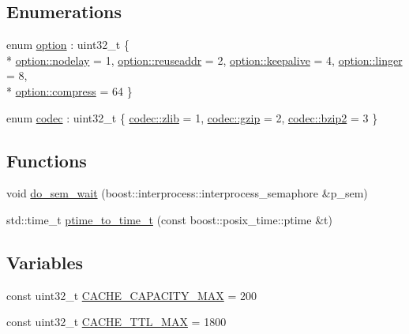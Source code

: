 \subsection*{Enumerations}
\begin{DoxyCompactItemize}
\item 
enum \hyperlink{namespacextd_1_1network_1_1utils_a0acc888a3cdabdadb91fe832ea196a4f}{option} \+: uint32\+\_\+t \{ \\*
\hyperlink{namespacextd_1_1network_1_1utils_a0acc888a3cdabdadb91fe832ea196a4faf0f888198330ff09558650aace4343e3}{option\+::nodelay} = 1, 
\hyperlink{namespacextd_1_1network_1_1utils_a0acc888a3cdabdadb91fe832ea196a4fa087d20314d2967622b76fbf7ce91ebf2}{option\+::reuseaddr} = 2, 
\hyperlink{namespacextd_1_1network_1_1utils_a0acc888a3cdabdadb91fe832ea196a4fa797919b5a9c95dfae9b06cf3086e40c1}{option\+::keepalive} = 4, 
\hyperlink{namespacextd_1_1network_1_1utils_a0acc888a3cdabdadb91fe832ea196a4fafa1711bb276806d1f1808dbb0e31018a}{option\+::linger} = 8, 
\\*
\hyperlink{namespacextd_1_1network_1_1utils_a0acc888a3cdabdadb91fe832ea196a4fa390626c545194d0f20a704589b190994}{option\+::compress} = 64
 \}
\item 
enum \hyperlink{namespacextd_1_1network_1_1utils_a3ac1216ad2037b366cc1f9051a978161}{codec} \+: uint32\+\_\+t \{ \hyperlink{namespacextd_1_1network_1_1utils_a3ac1216ad2037b366cc1f9051a978161a7a990d405d2c6fb93aa8fbb0ec1a3b23}{codec\+::zlib} = 1, 
\hyperlink{namespacextd_1_1network_1_1utils_a3ac1216ad2037b366cc1f9051a978161a749cadba7b2ed8d4a2aaa91a9cb1896c}{codec\+::gzip} = 2, 
\hyperlink{namespacextd_1_1network_1_1utils_a3ac1216ad2037b366cc1f9051a978161a03ce1ba314f367fdd09887fc8f60578b}{codec\+::bzip2} = 3
 \}
\end{DoxyCompactItemize}
\subsection*{Functions}
\begin{DoxyCompactItemize}
\item 
void \hyperlink{namespacextd_1_1network_1_1utils_a181758eb475ef5f4aebfec6c0ebec0c5}{do\+\_\+sem\+\_\+wait} (boost\+::interprocess\+::interprocess\+\_\+semaphore \&p\+\_\+sem)
\item 
std\+::time\+\_\+t \hyperlink{namespacextd_1_1network_1_1utils_aeee4bc5a0636807dd491f21938b7a1ca}{ptime\+\_\+to\+\_\+time\+\_\+t} (const boost\+::posix\+\_\+time\+::ptime \&t)
\end{DoxyCompactItemize}
\subsection*{Variables}
\begin{DoxyCompactItemize}
\item 
const uint32\+\_\+t \hyperlink{namespacextd_1_1network_1_1utils_a8939e806c4a6bc08b78a32941db7a130}{C\+A\+C\+H\+E\+\_\+\+C\+A\+P\+A\+C\+I\+T\+Y\+\_\+\+M\+AX} = 200
\item 
const uint32\+\_\+t \hyperlink{namespacextd_1_1network_1_1utils_adb4767541db3a79016a24142db705161}{C\+A\+C\+H\+E\+\_\+\+T\+T\+L\+\_\+\+M\+AX} = 1800
\end{DoxyCompactItemize}



